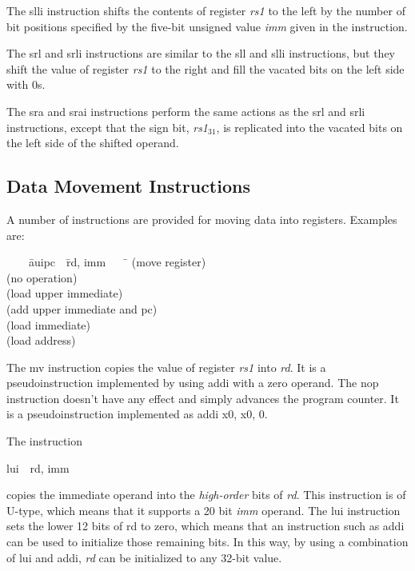 \documentclass[11pt, twoside, pdftex]{article}
\newenvironment{ctabbing}%
{\begin{center}\begin{minipage}{\textwidth}\begin{tabbing}}
{\end{tabbing}\end{minipage}\end{center}}
\begin{document}
\noindent
The {\sf slli} instruction shifts the contents of register {\it rs1} to the left by the number 
of bit positions specified by the five-bit unsigned value {\it imm} given in the instruction.

\noindent
The {\sf srl} and {\sf srli} instructions are similar to the {\sf sll} and {\sf slli}
instructions, but they shift the value of register {\it rs1} to the right and fill the vacated
bits on the left side with 0s.

\noindent
The {\sf sra} and {\sf srai} instructions perform the same actions as the {\sf srl} and 
{\sf srli} instructions, except that the sign bit, {\it rs1}$_{31}$, is replicated into 
the vacated bits on the left side of the shifted operand.

\subsection{Data Movement Instructions}

A number of instructions are provided for moving data into registers. Examples are:

\vspace{-\baselineskip}
\begin{ctabbing}
~~~~\={\sf auipc}~~\={\sf rd, imm}~~~~\=\kill
{}  \>(move register)\\
 \>\>(no operation)\\
  \>(load upper immediate)\\
  \>(add upper immediate and pc)\\
  \>(load immediate)\\
  \>(load address)\\
\end{ctabbing}
\vspace{-\baselineskip}
The {\sf mv} instruction copies the value of register {\it rs1} into {\it rd}.
It is a pseudoinstruction implemented by using {\sf addi} with a zero operand.
The {\sf nop} instruction doesn't have any effect and simply advances the program counter. 
It is a pseudoinstruction implemented as {\sf addi x0, x0, 0}.

The instruction
\vspace{-\baselineskip}
\begin{center}
{\sf lui~~rd, imm}
\end{center}
\noindent
copies the immediate operand into the {\it high-order} bits of {\it rd}. This instruction
is of U-type, which means that it supports a 20 bit {\it imm} operand. The {\sf lui}
instruction sets the lower 12 bits of rd to zero, which means that an instruction such as
{\sf addi} can be used to initialize those remaining bits. In this way, by using a combination 
of {\sf lui} and {\sf addi}, {\it rd} can be initialized to any 32-bit value. 
\end{document}
